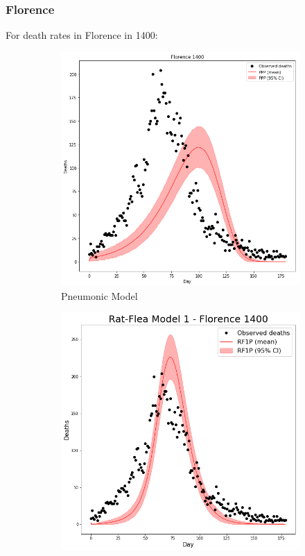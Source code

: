 \documentclass [letterpaper, 12pt] {article}
\begin{document}
\newpage

\subsubsection{Florence}
For death rates in Florence in 1400:

\begin{figure}[H]
	\begin{subfigure}{0.48\textwidth}
	\includegraphics[width=\linewidth]{pneum_florence.png}
	\caption{Pneumonic Model}
	\end{subfigure}\hspace{\fill}
	\begin{subfigure}{0.48\textwidth}
	\includegraphics[width=\linewidth]{rats1_florence.png}

\end{subfigure}
\end{figure}
\end{document}

